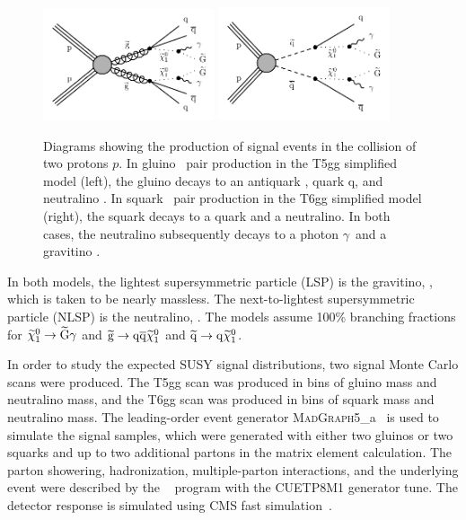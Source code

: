 \begin{figure}[htbp]
    \centering
    \includegraphics[width=0.45\textwidth]{Figures/Results/gluinoDecay.pdf}
    \includegraphics[width=0.45\textwidth]{Figures/Results/squarkDecay.pdf}
    \caption[Diagrams showing the production of signal events in the collision
        of two protons.]
    {Diagrams showing the production of signal events in the collision
        of two protons $p$. In gluino
        \gluino~pair production in the T5gg simplified model (left), the gluino
       decays to an antiquark \antiquark, quark q, and neutralino \neutralino. In
        squark \squark~pair production in the T6gg simplified model (right), the
        squark decays to a quark and a neutralino. In both cases, the
        neutralino subsequently decays to a photon $\gamma$~and a gravitino \gravitino.
        }
    \label{fig:gluinoSquarkDecay}
\end{figure}

In both models, the lightest supersymmetric particle (LSP) is the gravitino, \gravitino, which is taken to be nearly massless. The next-to-lightest supersymmetric particle (NLSP) is the neutralino, \neutralino. The models assume 100\% branching fractions for 
$\widetilde{\chi}^{0}_{1}\rightarrow\widetilde{\mathrm{G}}\gamma$ and 
$\widetilde{\mathrm{g}}\rightarrow \mathrm{q} \overline{\mathrm{q}} \widetilde{\chi}^{0}_{1}$ and 
$\widetilde{\mathrm{q}}\rightarrow \mathrm{q} \widetilde{\chi}^{0}_{1}$.

In order to study the expected SUSY signal distributions, two
signal Monte Carlo scans were produced.
The T5gg scan was produced in bins of gluino mass and neutralino mass,
and the T6gg scan was produced in bins of squark mass and neutralino mass.
The leading-order event generator \textsc{MadGraph}5\_a\MCATNLO~\cite{Alwall:2014hca}
is used to simulate the signal samples, which
were generated with either two gluinos or two squarks and up to two additional
partons in the matrix element calculation. The parton showering, hadronization,
multiple-parton interactions, and the underlying event were described by the
~\cite{Sjostrand:2007gs} program with the CUETP8M1 generator tune.
The detector response is simulated using
CMS fast simulation~\cite{Abdullin:2011zz}.

